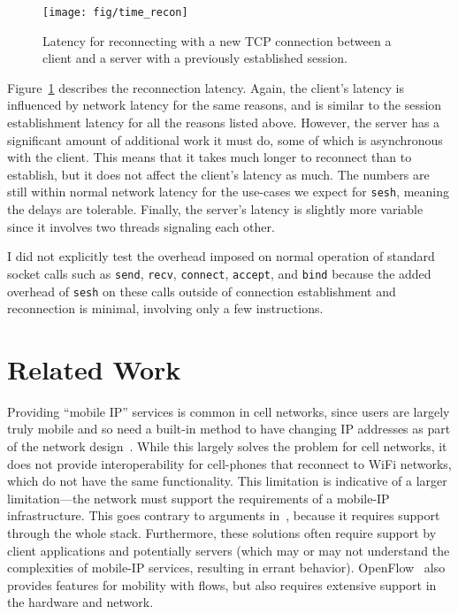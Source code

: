 \documentclass[twocolumn,11pt]{article}
\newcommand{\sesh}{\texttt{sesh}\xspace}
\begin{document}
\begin{figure}[!htb]
	\centering
	\hspace*{-3mm}
	\texttt{[image: fig/time\_recon]}
	\caption{Latency for reconnecting with a new TCP connection between a client
	and a server with a previously established session.}
	\label{fig:recon}
\end{figure}

Figure~\ref{fig:recon} describes the reconnection latency. Again, the client's
latency is influenced by network latency for the same reasons, and is similar to
the session establishment latency for all the reasons listed above. However, the
server has a significant amount of additional work it must do, some of which is
asynchronous with the client. This means that it takes much longer to reconnect
than to establish, but it does not affect the client's latency as much. The
numbers are still within normal network latency for the use-cases we expect for
\sesh, meaning the delays are tolerable. Finally, the server's latency is
slightly more variable since it involves two threads signaling each other.

I did not explicitly test the overhead imposed on normal operation of standard
socket calls such as \texttt{send}, \texttt{recv}, \texttt{connect},
\texttt{accept}, and \texttt{bind} because the added overhead of \sesh on these
calls outside of connection establishment and reconnection is minimal, involving
only a few instructions.

\section{Related Work}

Providing ``mobile IP'' services is common in cell networks, since users are
largely truly mobile and so need a built-in method to have changing IP addresses
as part of the network design~\cite{ltemob,mobileip,Kurose}. While this largely
solves the problem for cell networks, it does not provide interoperability for
cell-phones that reconnect to WiFi networks, which do not have the same
functionality. This limitation is indicative of a larger limitation---the
network must support the requirements of a mobile-IP infrastructure. This goes
contrary to arguments in~\cite{Saltzer}, because it requires support through the
whole stack. Furthermore, these solutions often require support by client
applications and potentially servers (which may or may not understand the
complexities of mobile-IP services, resulting in errant behavior).
OpenFlow~\cite{McKeown} also
provides features for mobility with flows, but also requires extensive support
in the hardware and network.
\end{document}
